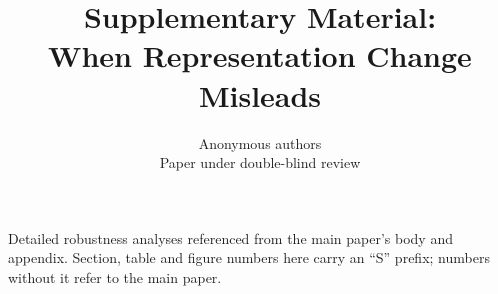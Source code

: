 \documentclass{article}
\title{Supplementary Material:\\
       When Representation Change Misleads}
\author{Anonymous authors\\
Paper under double-blind review}
\begin{document}
\maketitle

\noindent Detailed robustness analyses referenced from the main paper's body and
appendix.  Section, table and figure numbers here carry an ``S'' prefix; numbers
without it refer to the main paper.





\end{document}
